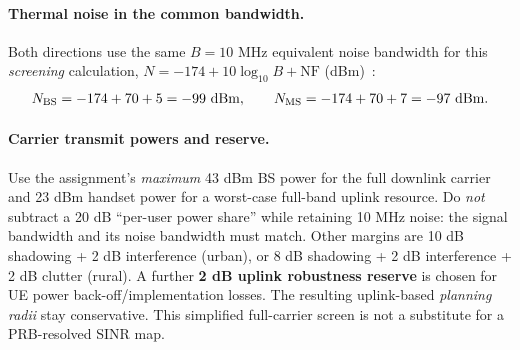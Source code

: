 \documentclass[9pt,a4paper]{extarticle}
\newcommand{\key}[1]{\textbf{#1}}
\begin{document}
\paragraph{Thermal noise in the common bandwidth.} Both directions use the same
$B=10$ MHz equivalent noise bandwidth for this \emph{screening} calculation,
$N=-174+10\log_{10}B+\mathrm{NF}$ (dBm)~\cite{rappaport}:
\[
N_{\rm BS}=-174+70+5=-99\ \text{dBm},\qquad
N_{\rm MS}=-174+70+7=-97\ \text{dBm}.
\]
\paragraph{Carrier transmit powers and reserve.} Use the assignment's \emph{maximum}
43 dBm BS power for the full downlink carrier and 23 dBm handset power for a
worst-case full-band uplink resource. Do \emph{not} subtract a 20 dB ``per-user power
share'' while retaining 10 MHz noise: the signal bandwidth and its noise bandwidth
must match. Other margins are 10 dB shadowing + 2 dB interference (urban), or 8 dB
shadowing + 2 dB interference + 2 dB clutter (rural). A further \key{2 dB uplink
robustness reserve} is chosen for UE power back-off/implementation losses. The
resulting uplink-based \emph{planning radii} stay conservative. This simplified
full-carrier screen is not a substitute for a PRB-resolved SINR map.
\end{document}
